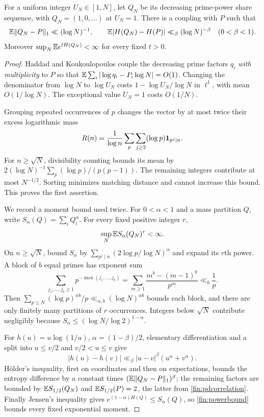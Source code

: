 \begin{lemma}\label{fin:entropycoupling}
For a uniform integer $U_N\in[1,N]$, let $Q_N$ be its decreasing
prime-power share sequence, with $Q_N=(1,0,\ldots)$ at $U_N=1$.
There is a coupling with $P$ such that
\[
 \mathbb E\|Q_N-P\|_1\ll(\log N)^{-1},\qquad
 \mathbb E|H(Q_N)-H(P)|\ll_\beta(\log N)^{-\beta}
 \quad(0<\beta<1).
\]
Moreover $\sup_N\mathbb E e^{tH(Q_N)}<\infty$ for every fixed $t>0$.
\end{lemma}
\begin{proof}
Haddad and Koukoulopoulos \cite{finHaddadKoukoulopoulos} couple the
decreasing prime factors $q_i$ \emph{with multiplicity} to $P$ so that
$\mathbb E\sum_i|\log q_i-P_i\log N|=O(1)$.
Changing the denominator from $\log N$ to $\log U_N$ costs
$1-\log U_N/\log N$ in $\ell^1$, with mean $O(1/\log N)$.
The exceptional value $U_N=1$ costs $O(1/N)$.

Grouping repeated occurrences of $p$ changes the vector by at most
twice their excess logarithmic mass
\[
 R(n)=\frac1{\log n}\sum_p\sum_{j\ge2}
                  (\log p){\bf1}_{p^j\mid n}.
\]
For $n\ge\sqrt N$, divisibility counting bounds its mean by
$2(\log N)^{-1}\sum_p(\log p)/(p(p-1))$.
The remaining integers contribute at most $N^{-1/2}$.
Sorting minimizes matching distance and cannot increase this bound.
This proves the first assertion.

We record a moment bound used twice.  For $0<\alpha<1$ and a mass
partition $Q$, write $S_\alpha(Q)=\sum_iQ_i^\alpha$.
For every fixed positive integer $r$,
\begin{equation}\label{fin:powerbound}
 \sup_N\mathbb E S_\alpha(Q_N)^r<\infty.
\end{equation}
On $n\ge\sqrt N$, bound $S_\alpha$ by
$\sum_{p^j\mid n}(2\log p/\log N)^\alpha$ and expand its $r$th power.
A block of $b$ equal primes has exponent sum
\[
 \sum_{j_1,\ldots,j_b\ge1}p^{-\max(j_1,\ldots,j_b)}
 =\sum_{m\ge1}\frac{m^b-(m-1)^b}{p^m}\ll_b\frac1p.
\]
Then $\sum_{p\le N}(\log p)^{\alpha b}/p
\ll_{\alpha,b}(\log N)^{\alpha b}$ bounds each block, and there are
only finitely many partitions of $r$ occurrences.
Integers below $\sqrt N$ contribute negligibly because
$S_\alpha\le(\log N/\log2)^{1-\alpha}$.

For $h(u)=u\log(1/u)$, $\alpha=(1-\beta)/2$, elementary differentiation
and a split into $u\le v/2$ and $v/2<u\le v$ give
\[
 |h(u)-h(v)|\ll_\beta |u-v|^\beta(u^\alpha+v^\alpha).
\]
Hölder's inequality, first on coordinates and then on expectations,
bounds the entropy difference by a constant times
$(\mathbb E\|Q_N-P\|_1)^\beta$; the remaining factors are bounded by
$\mathbb E S_{1/2}(Q_N)$ and
$\mathbb E S_{1/2}(P)=2$, the latter from \eqref{fin:pdcorrelation}.
Finally Jensen's inequality gives
$e^{(1-\alpha)H(Q)}\le S_\alpha(Q)$, so
\eqref{fin:powerbound} bounds every fixed exponential moment.
\end{proof}
